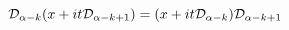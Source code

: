\begin{equation}
{\cal D}_{\alpha -k}(x+it
{\cal D}_{\alpha -k+1})=(x+it
{\cal D}_{\alpha -k}){\cal D}_{\alpha -k+1}
\label{dd}
\end{equation}

